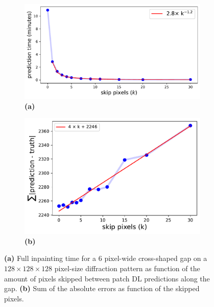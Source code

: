 \begin{figure}[h]
    \centering
    \begin{subfigure}{0.45\textwidth} %
        \centering
        \includegraphics[width=\linewidth]{figures/Inpainting/skip_pixels_time.pdf}
        \caption{\textbf{(a)}}
    \end{subfigure}
    \hfill
    \begin{subfigure}{0.45\textwidth}
        \centering
        \includegraphics[width=\linewidth]{figures/Inpainting/skip_error.pdf}
        \caption{\textbf{(b)}}
    \end{subfigure}
    \caption{\textbf{(a)} Full inpainting time for a 6 pixel-wide cross-shaped gap on a  $128\times128\times128$ pixel-size
    diffraction pattern as function of the amount of pixels skipped between patch DL predictions along the gap.
    \textbf{(b)} Sum of the absolute errors as function of the skipped pixels. }
    \label{fig:skip_case}
\end{figure}

